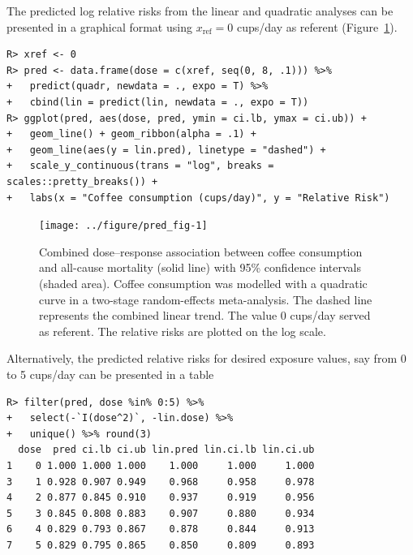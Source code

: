 \documentclass[11pt,a4paper,twoside,openany]{book}\usepackage{knitr}
\begin{document}
{{The predicted log relative risks from the linear and quadratic analyses can be presented in a graphical format using $x_\mathrm{ref} = 0$ cups/day as referent (Figure~\ref{fig:pred_fig}).

\begin{knitrout}\footnotesize
{}\color{fgcolor}\begin{kframe}
\begin{verbatim}
R> xref <- 0
R> pred <- data.frame(dose = c(xref, seq(0, 8, .1))) %>%
+   predict(quadr, newdata = ., expo = T) %>%
+   cbind(lin = predict(lin, newdata = ., expo = T))
R> ggplot(pred, aes(dose, pred, ymin = ci.lb, ymax = ci.ub)) +
+   geom_line() + geom_ribbon(alpha = .1) +
+   geom_line(aes(y = lin.pred), linetype = "dashed") +
+   scale_y_continuous(trans = "log", breaks = scales::pretty_breaks()) +
+   labs(x = "Coffee consumption (cups/day)", y = "Relative Risk")
\end{verbatim}
\end{kframe}\begin{figure}[ht!]

{\centering \texttt{[image: ../figure/pred\_fig-1]} 

}

\caption[Combined dose--response association between coffee consumption and all-cause mortality (solid line) with 95\% confidence intervals (shaded area)]{Combined dose--response association between coffee consumption and all-cause mortality (solid line) with 95\% confidence intervals (shaded area). Coffee consumption was modelled with a quadratic curve in a two-stage random-effects meta-analysis. The dashed line represents the combined linear trend. The value 0 cups/day served as referent. The relative risks are plotted on the log scale.}\label{fig:pred_fig}
\end{figure}


\end{knitrout}

\noindent Alternatively, the predicted relative risks for desired exposure values, say from 0 to 5 cups/day can be presented in a table

\begin{knitrout}\footnotesize
{}\color{fgcolor}\begin{kframe}
\begin{verbatim}
R> filter(pred, dose %in% 0:5) %>%
+   select(-`I(dose^2)`, -lin.dose) %>% 
+   unique() %>% round(3)
  dose  pred ci.lb ci.ub lin.pred lin.ci.lb lin.ci.ub
1    0 1.000 1.000 1.000    1.000     1.000     1.000
3    1 0.928 0.907 0.949    0.968     0.958     0.978
4    2 0.877 0.845 0.910    0.937     0.919     0.956
5    3 0.845 0.808 0.883    0.907     0.880     0.934
6    4 0.829 0.793 0.867    0.878     0.844     0.913
7    5 0.829 0.795 0.865    0.850     0.809     0.893
\end{verbatim}
\end{kframe}
\end{knitrout}

}}
\end{document}
